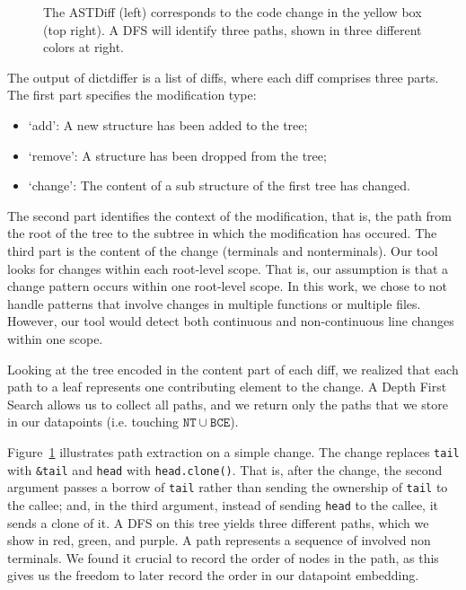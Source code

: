 \begin{figure}[h]
    
    \caption{\label{fig:extraction}The ASTDiff (left) corresponds to the code change in the yellow box (top right). A DFS will identify three paths, shown in three different colors at right.}

\end{figure}


The output of dictdiffer is a list of diffs, where each diff comprises three parts. The first part specifies the modification type:

\begin{itemize}
    \item `add': A new structure has been added to the tree; 
    \item `remove': A structure has been dropped from the tree; 
    \item `change': The content of a sub structure of the first tree has changed.
\end{itemize}

The second part identifies the context of the modification, that is, the path from the root of the tree to the subtree in which the modification has occured. The third part is the content of the change (terminals and nonterminals). Our tool looks for changes within each root-level scope. That is, our assumption is that a change pattern occurs within one root-level scope. In this work, we chose to not handle patterns that involve changes in multiple functions or multiple files. However, our tool would detect both continuous and non-continuous line changes within one scope.

Looking at the tree encoded in the content part of each diff, we realized that each path to a leaf represents one contributing element to the change. A Depth First Search allows us to collect all paths, and we return only the paths that we store in our datapoints (i.e. touching $\mathtt{NT} \cup \mathtt{BCE}$).

Figure~\ref{fig:extraction} illustrates path extraction on a simple change. The change replaces \verb+tail+ with \verb+&tail+ and \verb+head+ with \verb+head.clone()+. That is, after the change, the second argument passes a borrow of \verb+tail+ rather than sending the ownership of \verb+tail+ to the callee; and, in the third argument, instead of sending \verb+head+ to the callee, it sends a clone of it. A DFS on this tree yields three different paths, which we show in red, green, and purple. A path represents a sequence of involved non terminals. We found it crucial to record the order of nodes in the path, as this gives us the freedom to later record the order in our datapoint embedding.

